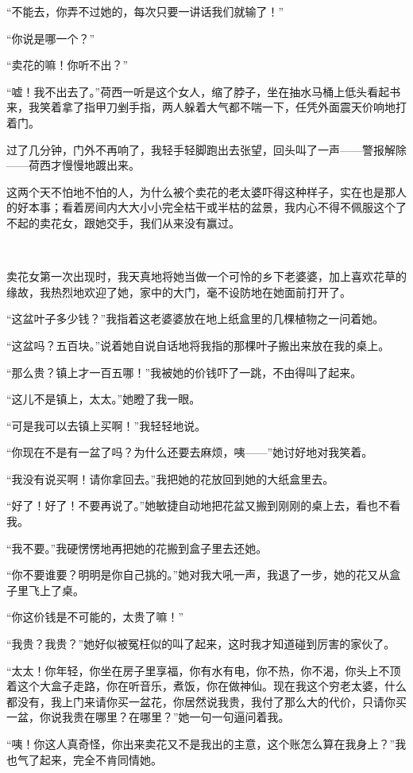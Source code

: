 \par “不能去，你弄不过她的，每次只要一讲话我们就输了！”
\par “你说是哪一个？”
\par “卖花的嘛！你听不出？”
\par “嘘！我不出去了。”荷西一听是这个女人，缩了脖子，坐在抽水马桶上低头看起书来，我笑着拿了指甲刀剉手指，两人躲着大气都不喘一下，任凭外面震天价响地打着门。
\par 过了几分钟，门外不再响了，我轻手轻脚跑出去张望，回头叫了一声——警报解除——荷西才慢慢地踱出来。
\par 这两个天不怕地不怕的人，为什么被个卖花的老太婆吓得这种样子，实在也是那人的好本事；看着房间内大大小小完全枯干或半枯的盆景，我内心不得不佩服这个了不起的卖花女，跟她交手，我们从来没有赢过。
\par  
\par 卖花女第一次出现时，我天真地将她当做一个可怜的乡下老婆婆，加上喜欢花草的缘故，我热烈地欢迎了她，家中的大门，毫不设防地在她面前打开了。
\par “这盆叶子多少钱？”我指着这老婆婆放在地上纸盒里的几棵植物之一问着她。
\par “这盆吗？五百块。”说着她自说自话地将我指的那棵叶子搬出来放在我的桌上。
\par “那么贵？镇上才一百五哪！”我被她的价钱吓了一跳，不由得叫了起来。
\par “这儿不是镇上，太太。”她瞪了我一眼。
\par “可是我可以去镇上买啊！”我轻轻地说。
\par “你现在不是有一盆了吗？为什么还要去麻烦，咦——”她讨好地对我笑着。
\par “我没有说买啊！请你拿回去。”我把她的花放回到她的大纸盒里去。
\par “好了！好了！不要再说了。”她敏捷自动地把花盆又搬到刚刚的桌上去，看也不看我。
\par “我不要。”我硬愣愣地再把她的花搬到盒子里去还她。
\par “你不要谁要？明明是你自己挑的。”她对我大吼一声，我退了一步，她的花又从盒子里飞上了桌。
\par “你这价钱是不可能的，太贵了嘛！”
\par “我贵？我贵？”她好似被冤枉似的叫了起来，这时我才知道碰到厉害的家伙了。
\par “太太！你年轻，你坐在房子里享福，你有水有电，你不热，你不渴，你头上不顶着这个大盒子走路，你在听音乐，煮饭，你在做神仙。现在我这个穷老太婆，什么都没有，我上门来请你买一盆花，你居然说我贵，我付了那么大的代价，只请你买一盆，你说我贵在哪里？在哪里？”她一句一句逼问着我。
\par “咦！你这人真奇怪，你出来卖花又不是我出的主意，这个账怎么算在我身上？”我也气了起来，完全不肯同情她。
